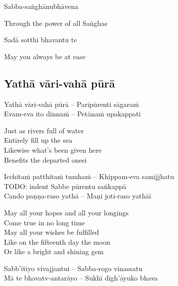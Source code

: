 Sabba-saṅghānubhāvena

\begin{english}
  Through the power of all Saṅghas
\end{english}

Sadā sotthī bhavantu te

\begin{english}
  May you always be at ease
\end{english}



\subsection{Yathā vāri-vahā pūrā}
\label{yatha-vari-vaha-pura}

\begin{twochants}
  Yathā vāri-vahā pūrā – Paripūrenti sāgaraṁ\\
  Evam-eva ito dinnaṁ – Petānaṁ upakappati
\end{twochants}

\begin{english}
  Just as rivers full of water\\
  Entirely fill up the sea\\
  Likewise what's been given here\\
  Benefits the departed onesi
\end{english}

\suttaRef{[Khp 1.7]}

\begin{twochants}
  Icchitaṁ patthitaṁ tumhaṁ – Khippam-eva samijjhatu\\
  TODO: indent Sabbe pūrentu saṅkappā\\
  Cando paṇṇa-raso yathā – Maṇi joti-raso yathāi
\end{twochants}

\begin{english}
  May all your hopes and all your longings\\
  Come true in no long time\\
  May all your wishes be fulfilled\\
  Like on the fifteenth day the moon\\
  Or like a bright and shining gem
\end{english}

\begin{twochants}
  Sabb'ītiyo vivajjantui – Sabba-rogo vinassatu\\
  Mā te bhavatv-antarāyo – Sukhī dīgh'āyuko bhava
\end{twochants}

